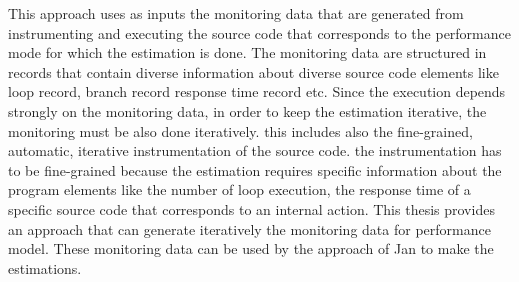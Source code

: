 This approach uses as inputs the monitoring data that are generated from instrumenting and executing the source code that corresponds to the performance mode for which the estimation is done. The monitoring data are structured in records that contain diverse information about diverse source code elements like loop record, branch record response time record etc. Since the execution depends strongly on the monitoring data, in order to keep the estimation iterative, the monitoring must be also done iteratively. this includes also the fine-grained, automatic, iterative instrumentation of the source code. the instrumentation has to be fine-grained because the estimation requires specific information about the program elements like the number of loop execution, the response time of a specific source code that corresponds to an internal action. This thesis provides an approach that can generate iteratively the monitoring data for performance model. These monitoring data can be used by the approach of Jan to make the estimations.







